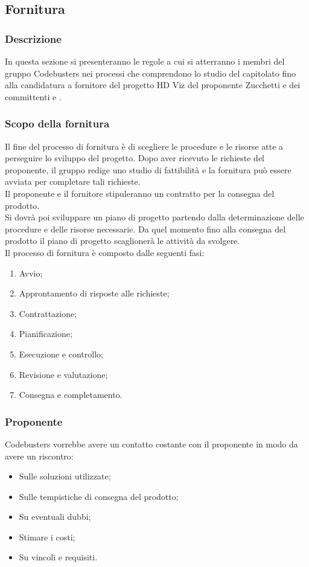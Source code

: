 \subsection{Fornitura}
\subsubsection{Descrizione}
In questa sezione si presenteranno le regole a cui si atterranno i membri del gruppo Codebusters nei processi che comprendono lo studio del capitolato fino alla candidatura a fornitore del progetto HD Viz del proponente Zucchetti e dei committenti \VT e \CR .  
\subsubsection{Scopo della fornitura}
Il fine del processo di fornitura è di scegliere le procedure e le risorse atte a perseguire lo sviluppo del progetto. Dopo aver ricevuto le richieste del proponente, il gruppo redige uno studio di fattibilità e la fornitura può essere avviata per completare tali richieste.\\
Il proponente e il fornitore stipuleranno un contratto per la consegna del prodotto.\\
Si dovrà poi sviluppare un piano di progetto partendo dalla determinazione delle procedure e delle risorse necessarie.
Da quel momento fino alla consegna del prodotto il piano di progetto scaglionerà le attività da svolgere. \\
 Il processo di fornitura è composto dalle seguenti fasi:
 \begin{enumerate}
 \item Avvio; 
\item Approntamento di risposte alle richieste;
\item Contrattazione;
\item Pianificazione;
\item Esecuzione e controllo;
\item Revisione e valutazione;
\item Consegna e completamento.
 \end{enumerate}
\subsubsection{Proponente}
Codebusters vorrebbe avere un contatto costante con il proponente in modo da avere un riscontro:
\begin{itemize}
\item Sulle soluzioni utilizzate;
\item Sulle tempistiche di consegna del prodotto;
\item Su eventuali dubbi;
\item Stimare i costi;
\item Su vincoli e requisiti.
\end{itemize}
